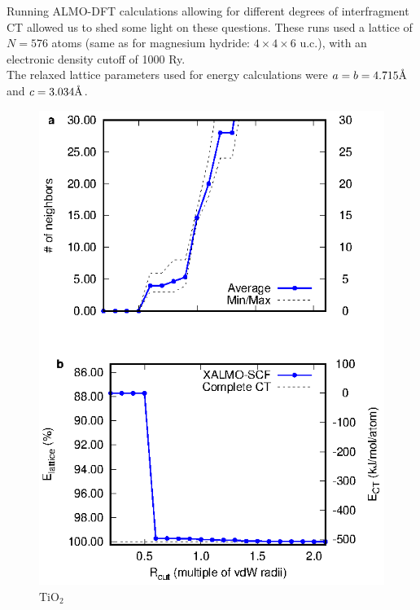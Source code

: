 \documentclass[aps,prb,twocolumn,amsmath,amssymb,superscriptaddress,longbibliography]{revtex4-1}
\newcommand{\angstrom}{\text{\normalfont\AA}}
\begin{document}
Running ALMO-DFT calculations allowing for different degrees of interfragment CT allowed us to shed some light on these questions.
These runs used a lattice of $N = 576$ atoms (same as for magnesium hydride: $4\times 4\times 6$ u.c.), with an electronic density cutoff of 1000 Ry.\\
The relaxed lattice parameters used for energy calculations were $a = b = 4.715\angstrom$ and $c = 3.034\angstrom$.\\


\begin{figure}
\includegraphics[scale=1]{plots/TiO2_EvR}
\caption{$\text{TiO}_{2}$}
\label{tio2graph}
\end{figure}
\end{document}
